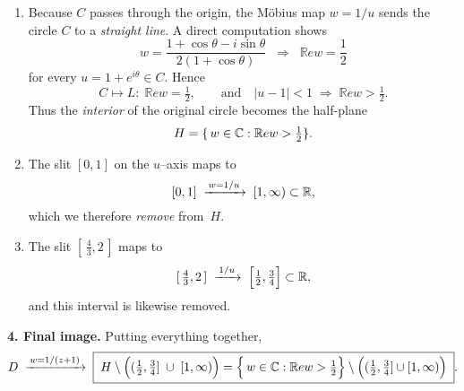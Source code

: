 \documentclass[12pt]{article}
\theoremstyle{definition} %
\theoremstyle{plain} %
\begin{document}
  \begin{enumerate}
  \item Because $C$ passes through the origin, the Möbius map $w=1/u$
        sends the circle $C$ to a \emph{straight line}.  
        A direct computation shows
        \[
           w=\frac{1+\cos\theta-i\sin\theta}{2(1+\cos\theta)}
           \;\;\Longrightarrow\;\;
           \mathbb{R}e w=\frac12
        \]
        for every $u=1+e^{i\theta}\in C$.  
        Hence
        \[
          C\longmapsto L:\;\mathbb{R}e w=\tfrac12,
          \qquad
          \text{and}\quad
          |u-1|<1\;\Longrightarrow\;\mathbb{R}e w>\tfrac12.
        \]
        Thus the \emph{interior} of the original circle
        becomes the half-plane
        \[
          H=\{\,w\in\Bbb C:\mathbb{R}e w>\tfrac12\}.
        \]
  \item The slit $[0,1]$ on the $u$–axis maps to
        \[
           [0,1]\;\xrightarrow{\,w=1/u\,}\;[1,\infty)\subset\Bbb R,
        \]
        which we therefore \emph{remove} from~$H$.
  
  \item The slit $[\,\tfrac43,2\,]$ maps to
        \[
           [\,\tfrac43,2\,]\;\xrightarrow{\,1/u\,}\;
           \Bigl[\tfrac12,\tfrac34\Bigr]\subset\Bbb R,
        \]
        and this interval is likewise removed.
  \end{enumerate}
  
  \bigskip
  \textbf{4.  Final image.}\;
  Putting everything together,
  \[
     D\;\xrightarrow{\,w=1/(z+1)\,}\;
     \boxed{\;H\setminus\Bigl((\tfrac12,\tfrac34]\;\cup\;[1,\infty)\Bigr)
     =\Bigl\{\,w\in\Bbb C:\mathbb{R}e w>\tfrac12\Bigr\}
       \setminus\Bigl((\tfrac12,\tfrac34]\cup[1,\infty)\Bigr)\;}.
  \]
  
\end{document}
